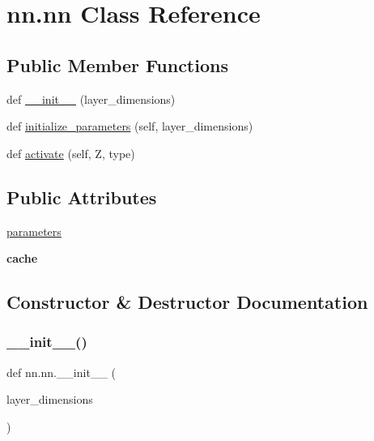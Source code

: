 \hypertarget{classnn_1_1nn}{}\section{nn.\+nn Class Reference}
\label{classnn_1_1nn}
\subsection*{Public Member Functions}
\begin{DoxyCompactItemize}
\item 
def \hyperlink{classnn_1_1nn_a1992cc6f205d0db65e338feef37e92dd}{\+\_\+\+\_\+init\+\_\+\+\_\+} (layer\+\_\+dimensions)
\item 
def \hyperlink{classnn_1_1nn_a9821fed1369b4d709fe297fe9e07d97b}{initialize\+\_\+parameters} (self, layer\+\_\+dimensions)
\item 
def \hyperlink{classnn_1_1nn_a60e827e96d3ce9b65a7563093cbd26fe}{activate} (self, Z, type)
\end{DoxyCompactItemize}
\subsection*{Public Attributes}
\begin{DoxyCompactItemize}
\item 
\hyperlink{classnn_1_1nn_a69da89bd6d17dbc8596ab586b7678237}{parameters}
\item 
\mbox{\label{classnn_1_1nn_a1f75a6242fc9ee82ca2632e18979b4d3}} 
{\bfseries cache}
\end{DoxyCompactItemize}


\subsection{Constructor \& Destructor Documentation}
\mbox{\label{classnn_1_1nn_a1992cc6f205d0db65e338feef37e92dd}} 
\subsubsection{\texorpdfstring{\+\_\+\+\_\+init\+\_\+\+\_\+()}{\_\_init\_\_()}}
{\footnotesize\ttfamily def nn.\+nn.\+\_\+\+\_\+init\+\_\+\+\_\+ (\begin{DoxyParamCaption}\item[{}]{layer\+\_\+dimensions }\end{DoxyParamCaption})}

